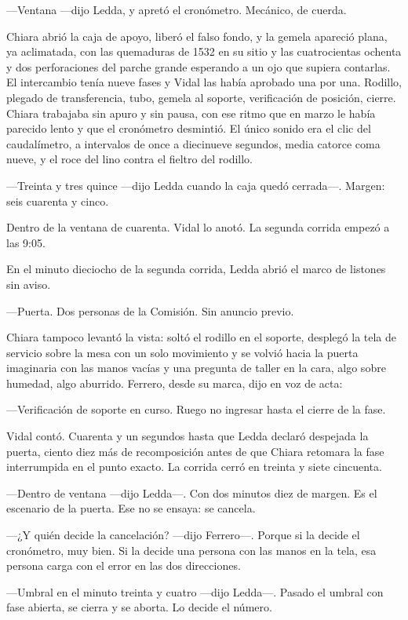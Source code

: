 ---Ventana ---dijo Ledda, y apretó el cronómetro. Mecánico, de cuerda.

Chiara abrió la caja de apoyo, liberó el falso fondo, y la gemela apareció plana, ya aclimatada, con las quemaduras de 1532 en su sitio y las cuatrocientas ochenta y dos perforaciones del parche grande esperando a un ojo que supiera contarlas. El intercambio tenía nueve fases y Vidal las había aprobado una por una. Rodillo, plegado de transferencia, tubo, gemela al soporte, verificación de posición, cierre. Chiara trabajaba sin apuro y sin pausa, con ese ritmo que en marzo le había parecido lento y que el cronómetro desmintió. El único sonido era el clic del caudalímetro, a intervalos de once a diecinueve segundos, media catorce coma nueve, y el roce del lino contra el fieltro del rodillo.

---Treinta y tres quince ---dijo Ledda cuando la caja quedó cerrada---. Margen: seis cuarenta y cinco.

Dentro de la ventana de cuarenta. Vidal lo anotó. La segunda corrida empezó a las 9:05.

En el minuto dieciocho de la segunda corrida, Ledda abrió el marco de listones sin aviso.

---Puerta. Dos personas de la Comisión. Sin anuncio previo.

Chiara tampoco levantó la vista: soltó el rodillo en el soporte, desplegó la tela de servicio sobre la mesa con un solo movimiento y se volvió hacia la puerta imaginaria con las manos vacías y una pregunta de taller en la cara, algo sobre humedad, algo aburrido. Ferrero, desde su marca, dijo en voz de acta:

---Verificación de soporte en curso. Ruego no ingresar hasta el cierre de la fase.

Vidal contó. Cuarenta y un segundos hasta que Ledda declaró despejada la puerta, ciento diez más de recomposición antes de que Chiara retomara la fase interrumpida en el punto exacto. La corrida cerró en treinta y siete cincuenta.

---Dentro de ventana ---dijo Ledda---. Con dos minutos diez de margen. Es el escenario de la puerta. Ese no se ensaya: se cancela.

---¿Y quién decide la cancelación? ---dijo Ferrero---. Porque si la decide el cronómetro, muy bien. Si la decide una persona con las manos en la tela, esa persona carga con el error en las dos direcciones.

---Umbral en el minuto treinta y cuatro ---dijo Ledda---. Pasado el umbral con fase abierta, se cierra y se aborta. Lo decide el número.

